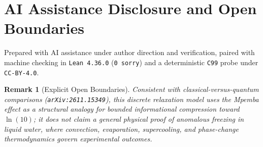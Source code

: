 \documentclass[11pt,a4paper]{article}
\newtheorem{remark}{Remark}
\begin{document}
\section*{AI Assistance Disclosure and Open Boundaries}
Prepared with AI assistance under author direction and verification, paired with machine checking in \texttt{Lean~4.36.0} (\texttt{0~sorry}) and a deterministic \texttt{C99} probe under \texttt{CC-BY-4.0}.

\begin{remark}[Explicit Open Boundaries]
Consistent with classical-versus-quantum comparisons (\texttt{arXiv:2611.15349}), this discrete relaxation model uses the Mpemba effect as a structural analogy for bounded informational compression toward $\ln(10)$; it does not claim a general physical proof of anomalous freezing in liquid water, where convection, evaporation, supercooling, and phase-change thermodynamics govern experimental outcomes.
\end{remark}
\end{document}
